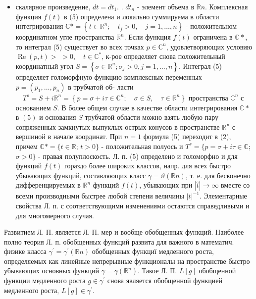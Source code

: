 \documentclass[10pt]{article}
\begin{document}
\begin{itemize}

  \item скалярное произведение, $d t=d t_{1}$. . $d t_{n}$ - элемент объема в $\mathbb{R} n$. Комплексная функция $f(t)$ в (5) определена и локально суммируема в области интегрирования $\mathbb{C} *=\left\{t \in \mathbb{R}^{n} ; \quad t_{j}>0, \quad j=1, \ldots, n\right\}$ - положительном координатном угле пространства $\mathbb{R}^{n}$. Если функция $f(t)$ ограничена в $\mathbb{C} *$, то интеграл (5) существует во всех точках $p \in \mathbb{C}^{n}$, удовлетворяющих условию $\operatorname{Re}(p, t)>$ $>0, \quad t \in \mathbb{C}^{*}$, к-рое определяет снова положительный координатный угол $S=\left\{\sigma \in \mathbb{R}^{n} ; \sigma_{j}>0, j=1, \ldots, n\right\}$. Интеграл (5) определяет голоморфную функцию комплексных переменных $p=\left(p_{1}, \ldots, p_{n}\right)$ в трубчатой об- ласти $\quad T^{s}=S+i \mathbb{R}^{n}=\left\{p=\sigma+i \tau \in \mathbb{C}^{n} ; \quad \sigma \in S, \quad \tau \in \mathbb{R}^{n}\right\}$ пространства $\mathbb{C}^{n}$ с основанием $S$. В более общем случае в качестве области интегрирования $\mathbb{C} *$ в $(5)$ и основания $S$ трубчатой области можно взять любую пару сопряженных замкнутых выпуклых острых конусов в пространстве $\mathbb{R}^{\boldsymbol{n}}$ с вершиной в начале координат. При $n=1$ формула (5) переходит в (2), причем $\mathbb{C} *=\{t \in \mathbb{R}$; $t>0\}$ - положительная полуось и $T^{s}=\{p=\sigma+i \tau \in \mathbb{C}$; $\sigma>0\}$ - правая полуплоскость. Л. п. (5) определено и голоморфно и для функций $f(t)$ гораздо более широких классов, напр. для всех быстро убывающих функций, составляющих класс $\gamma=\vartheta(\mathbb{R} n)$, т. е. для бесконечно дифференцируемых в $\mathbb{R}^{n}$ функций $f(t)$, убывающих при $|\hat{t}| \rightarrow \infty$ вместе со всеми производными быстрее любой степени величины $|t|^{-1}$. Элементарные свойства Л. п. с соответствующими изменениями остаются справедливыми и для многомерного случая.

\end{itemize}



Развитием Л. П. является Л. П. мер и вообще обобщенных функций. Наиболее полно теория Л. п. обобщенных функций развита для важного в математич. физике класса $\gamma^{\prime}=\gamma^{\prime}(\mathbb{R} n)$ обобщенных функциї медленного роста, определяемых как линейные непрерывные функционалы на пространстве быстро убывающих основных функций $\gamma=\gamma\left(\mathbb{R}^{n}\right)$. Такое Л. П. $L[g]$ обобщенной функции медленного роста $g \in \gamma^{\prime}$ снова является обобщенной функцией медленного роста, $L[g] \in \gamma^{\prime}$.
\end{document}
